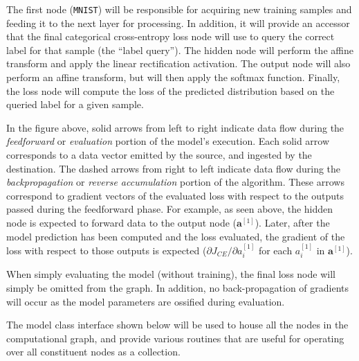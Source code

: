 \documentclass[
]{article}
\begin{document}
The first node (\texttt{MNIST}) will be responsible for acquiring new
training samples and feeding it to the next layer for processing. In
addition, it will provide an accessor that the final categorical
cross-entropy loss node will use to query the correct label for that
sample (the ``label query''). The hidden node will perform the affine
transform and apply the linear rectification activation. The output node
will also perform an affine transform, but will then apply the softmax
function. Finally, the loss node will compute the loss of the predicted
distribution based on the queried label for a given sample.

In the figure above, solid arrows from left to right indicate data flow
during the \emph{feedforward} or \emph{evaluation} portion of the
model's execution. Each solid arrow corresponds to a data vector emitted
by the source, and ingested by the destination. The dashed arrows from
right to left indicate data flow during the \emph{backpropagation} or
\emph{reverse accumulation} portion of the algorithm. These arrows
correspond to gradient vectors of the evaluated loss with respect to the
outputs passed during the feedforward phase. For example, as seen above,
the hidden node is expected to forward data to the output node
(\(\mathbf{a}^{[1]}\)). Later, after the model prediction has been
computed and the loss evaluated, the gradient of the loss with respect
to those outputs is expected (\(\partial J_{CE}/\partial a^{[1]}_i\) for
each \(a_i^{[1]}\) in \(\mathbf{a}^{[1]}\)).

When simply evaluating the model (without training), the final loss node
will simply be omitted from the graph. In addition, no back-propagation
of gradients will occur as the model parameters are ossified during
evaluation.

The model class interface shown below will be used to house all the
nodes in the computational graph, and provide various routines that are
useful for operating over all constituent nodes as a collection.
\end{document}
